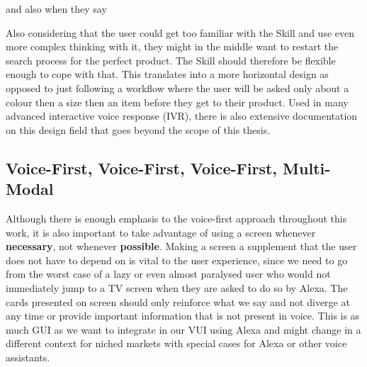 

\noindent and also when they say 



Also considering that the user could get too familiar with the Skill and use even more complex thinking with it, they might in the middle want to restart the search process for the perfect product. The Skill should therefore be flexible enough to cope with that. This translates into a more horizontal design as opposed to just following a workflow where the user will be asked only about a colour then a size then an item before they get to their product. Used in many advanced interactive voice response (IVR), there is also extensive documentation on this design field that goes beyond the scope of this thesis.



\subsection*{Voice-First, Voice-First, Voice-First, Multi-Modal}

Although there is enough emphasis to the voice-first approach throughout this work, it is also important to take advantage of using a screen whenever \textbf{necessary}, not whenever \textbf{possible}. Making a screen a supplement that the user does not have to depend on is vital to the user experience, since we need to go from the worst case of a lazy or even almost paralysed user who would not immediately jump to a TV screen when they are asked to do so by Alexa. The cards presented on screen should only reinforce what we say and not diverge at any time or provide important information that is not present in voice. This is as much GUI as we want to integrate in our VUI using Alexa and might change in a different context for niched markets with special cases for Alexa or other voice assistants.


